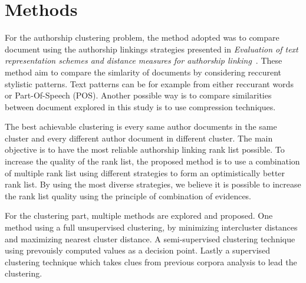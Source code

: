 \section{Methods \label{sec:methods}}

For the authorship clustering problem, the method adopted was to compare document using the authorship linkings strategies presented in \textit{Evaluation of text representation schemes and distance measures for authorship linking}~\cite{kocher_verification}.
These method aim to compare the simlarity of documents by considering reccurent stylistic patterns.
Text patterns can be for example from either reccurant words or Part-Of-Speech (POS).
Another possible way is to compare similarities between document explored in this study is to use compression techniques.

The best achievable clustering is every same author documents in the same cluster and every different author document in different cluster.
The main objective is to have the most reliable authorship linking rank list possible.
To increase the quality of the rank list, the proposed method is to use a combination of multiple rank list using different strategies to form an optimistically better rank list.
By using the most diverse strategies, we believe it is possible to increase the rank list quality using the principle of combination of evidences.

For the clustering part, multiple methods are explored and proposed.
One method using a full unsupervised clustering, by minimizing intercluster distances and maximizing nearest cluster distance.
A semi-supervised clustering technique using prevouisly computed values as a decision point.
Lastly a supervised clustering technique which takes clues from previous corpora analysis to lead the clustering.








